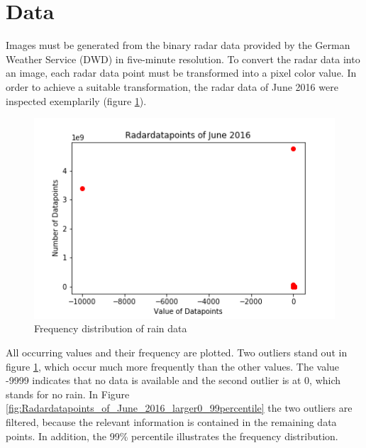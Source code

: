 \documentclass[oneside]{htwg-report}
\begin{document}
\section*{Data}\label{data}
\begin{sloppypar}
Images must be generated from the binary radar data provided by the German Weather Service (DWD) in five-minute resolution.
To convert the radar data into an image, each radar data point must be transformed into a pixel color value.
In order to achieve a suitable transformation, the radar data of June 2016 were inspected exemplarily (figure \ref{fig:Radardatapoints_of_June_2016}). 
\end{sloppypar}
\begin{figure}[ht]
    \centering
    \includegraphics[width=1\linewidth,angle=0]{../abb/Radardatapoints_of_June_2016.png}
    \caption[Datenaufbereitung]{Frequency distribution of rain data}
    \label{fig:Radardatapoints_of_June_2016}
\end{figure}
\begin{sloppypar}
All occurring values and their frequency are plotted. 
Two outliers stand out in figure \ref{fig:Radardatapoints_of_June_2016}, which occur much more frequently than the other values. 
The value -9999 indicates that no data is available and the second outlier is at 0, which stands for no rain. 
In Figure \ref{fig:Radardatapoints_of_June_2016_larger0_99percentile} the two outliers are filtered, because the relevant information is contained in the remaining data points.
In addition, the 99\% percentile illustrates the frequency distribution. 
\end{sloppypar}
\end{document}

